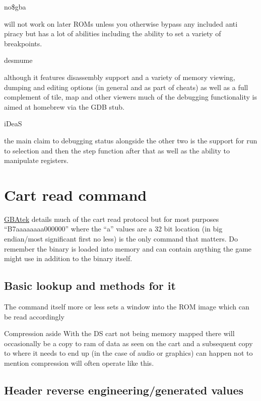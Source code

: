 \documentclass[
]{book}
\begin{document}
no\$gba

will not work on later ROMs unless you otherwise bypass any included anti piracy but has a lot of abilities including the ability to set a variety of breakpoints.

desmume

although it features disassembly support and a variety of memory viewing, dumping and editing options (in general and as part of cheats) as well as a full complement of tile, map and other viewers much of the debugging functionality is aimed at homebrew via the GDB stub.

iDeaS

the main claim to debugging status alongside the other two is the support for run to selection and then the step function after that as well as the ability to manipulate registers.

\hypertarget{cart-read-command}{%
\section{Cart read command}\label{cart-read-command}}

\href{http://problemkaputt.de/gbatek.htm\#dscartridgeprotocol}{GBAtek} details much of the cart read protocol but for most purposes ``B7aaaaaaaa000000'' where the ``a'' values are a 32 bit location (in big endian/most significant first no less) is the only command that matters. Do remember the binary is loaded into memory and can contain anything the game might use in addition to the binary itself.

\hypertarget{basic-lookup-and-methods-for-it}{%
\subsection{Basic lookup and methods for it}\label{basic-lookup-and-methods-for-it}}

The command itself more or less sets a window into the ROM image which can be read accordingly

Compression aside With the DS cart not being memory mapped there will occasionally be a copy to ram of data as seen on the cart and a subsequent copy to where it needs to end up (in the case of audio or graphics) can happen not to mention compression will often operate like this.

\hypertarget{header-reverse-engineeringgenerated-values}{%
\subsection{Header reverse engineering/generated values}\label{header-reverse-engineeringgenerated-values}}
\end{document}

